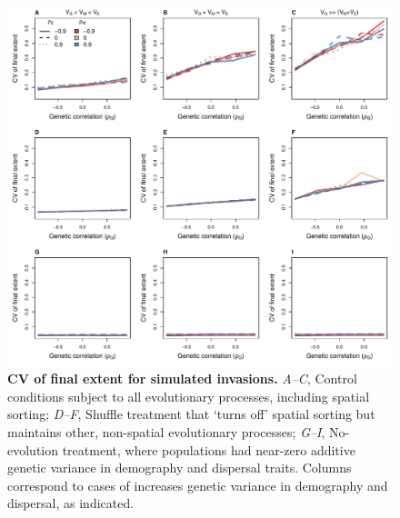 \documentclass[11pt]{article}
\begin{document}
\newpage{}
\begin{figure}[h!]
\centering
\includegraphics[width=1\linewidth]{Figures/app_fig_CV}
\caption{\textbf{CV of final extent for simulated invasions.} \textit{A--C}, Control conditions subject to all evolutionary processes, including spatial sorting; \textit{D--F}, Shuffle treatment that `turns off' spatial sorting but maintains other, non-spatial evolutionary processes; \textit{G--I}, No-evolution treatment, where populations had near-zero additive genetic variance in demography and dispersal traits. Columns correspond to cases of increases genetic variance in demography and dispersal, as indicated.}
\label{corr:app_fig_CV}
\end{figure}
\end{document}
